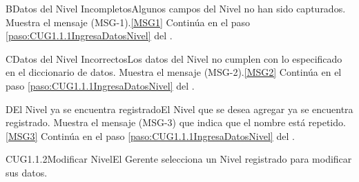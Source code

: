 	\begin{UCtrayectoriaA}{B}{Datos del Nivel Incompletos}{Algunos campos del Nivel no han sido capturados.}
			\UCpaso Muestra el mensaje (MSG-1).\ref{MSG1}
			\UCpaso Continúa en el paso \ref{paso:CUG1.1.1IngresaDatosNivel} del .
	\end{UCtrayectoriaA}

	\begin{UCtrayectoriaA}{C}{Datos del Nivel Incorrectos}{Los datos del Nivel no cumplen con lo especificado en el diccionario de datos.}
			\UCpaso Muestra el mensaje (MSG-2).\ref{MSG2}
			\UCpaso Continúa en el paso \ref{paso:CUG1.1.1IngresaDatosNivel} del .
	\end{UCtrayectoriaA}

		\begin{UCtrayectoriaA}{D}{El Nivel ya se encuentra registrado}{El Nivel que se desea agregar ya se encuentra registrado.}
			\UCpaso Muestra el mensaje (MSG-3) que indica que el nombre está repetido.\ref{MSG3}
			\UCpaso Continúa en el paso \ref{paso:CUG1.1.1IngresaDatosNivel} del .
		\end{UCtrayectoriaA}

	\begin{UseCase}{CUG1.1.2}{Modificar Nivel}{El Gerente selecciona un Nivel registrado para modificar sus datos.}
	\end{UseCase}

